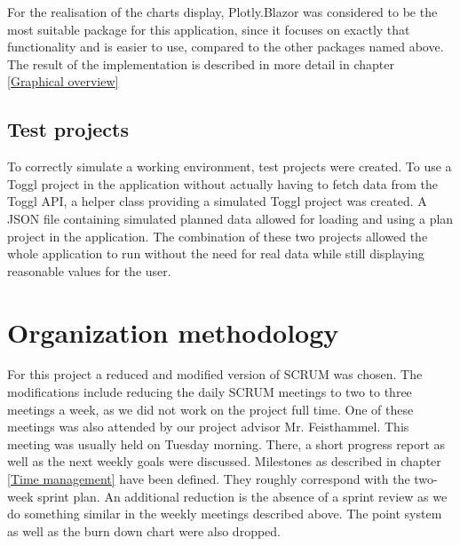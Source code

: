 For the realisation of the charts display, Plotly.Blazor was considered to be the most suitable package for this application, since it focuses on exactly that functionality and is easier to use, compared to the other packages named above. The result of the implementation is described in more detail in chapter \ref{Graphical overview}

\subsection{Test projects}
To correctly simulate a working environment, test projects were created. To use a Toggl project in the application without actually having to fetch data from the Toggl API, a helper class providing a simulated Toggl project was created. A JSON file containing simulated planned data allowed for loading and using a plan project in the application. The combination of these two projects allowed the whole application to run without the need for real data while still displaying reasonable values for the user.

\section{Organization methodology}
For this project a reduced and modified version of SCRUM \cite{scrum_url} was chosen. The modifications include reducing the daily SCRUM meetings to two to three meetings a week, as we did not work on the project full time. One of these meetings was also attended by our project advisor Mr. Feisthammel. This meeting was usually held on Tuesday morning. There, a short progress report as well as the next weekly goals were discussed. Milestones as described in chapter \ref{Time management} have been defined. They roughly correspond with the two-week sprint plan. An additional reduction is the absence of a sprint review as we do something similar in the weekly meetings described above. The point system as well as the burn down chart were also dropped.

